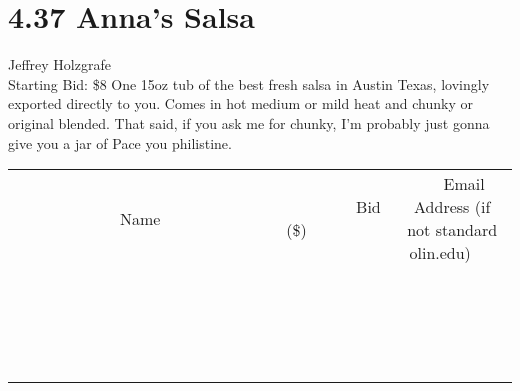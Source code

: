 \documentclass[11pt]{article}
\begin{document}
\section*{4.37 Anna's Salsa}
Jeffrey Holzgrafe
\\
Starting Bid: \$8
\newline
One 15oz tub of the best fresh salsa in Austin Texas, lovingly exported directly to you. Comes in hot medium or mild heat and chunky or original blended. That said, if you ask me for chunky, I'm probably just gonna give you a jar of Pace you philistine.
\\[3ex]
\begin{tabular}{c c c}
~~~~~~~~~~~~~Name~~~~~~~~~~~~~ & ~~~~~~~~~Bid (\$)~~~~~~~~~  & ~~~Email Address (if not standard olin.edu)~~~\\
 & & \\
\hline
 & & \\
\hline
 & & \\
\hline
 & & \\
\hline
 & & \\
\hline
 & & \\
\hline
 & & \\
\hline
 & & \\
\hline
 & & \\
\hline
 & & \\
\hline
 & & \\
\hline
 & & \\
\hline
 & & \\
\hline
 & & \\
\hline
 & & \\
\hline
 & & \\
\hline
 & & \\
\hline
 & & \\
\hline
 & & \\
\hline
\end{tabular}
\newpage
\end{document}
